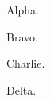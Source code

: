 \documentclass{article}
\begin{document}
\noindent Alpha.\par
\everypar{[ep]}
\noindent Bravo.\par
Charlie.\par
\indent Delta.\par
\end{document}
